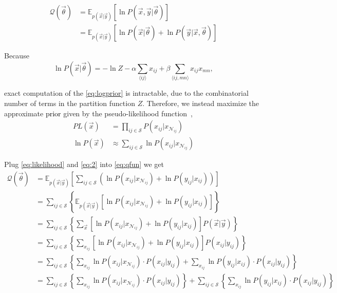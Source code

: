\documentclass[12pt]{article}
\begin{document}
\begin{align}
  \mathcal{Q}(\vec \theta) &= \mathbb{E}_{p(\vec x| \vec y)} [\ln P(\vec x, \vec y | \vec \theta)]\nonumber\\
  &= \mathbb{E}_{p(\vec x| \vec y)}[\ln P(\vec x| \vec \theta) + \ln P(\vec y | \vec x, \vec \theta) ] \label{eq:qfun}
\end{align}

Because 
\begin{equation}\ln P(\vec x | \vec \theta) = -\ln Z - \alpha \sum_{\langle ij \rangle} x_{ij} + \beta \sum_{\langle ij, mn \rangle} x_{ij}x_{mn}, \label{eq:logprior}
\end{equation}

exact  computation of the \eqref{eq:logprior} is intractable, due to
the combinatorial number of terms in the partition function $Z$. Therefore, we
instead maximize the approximate \textcolor{black}{prior} given by the pseudo-likelihood
function~\cite{li_markov_2009,besag_spatial_1974},
\begin{align}
  PL(\vec x) &= \prod_{ij \in \mathcal{S}}^{}P (x_{ij}|x_{\mathcal{N}_{ij}})\\
  \ln P(\vec x) &\approx \sum_{ij \in \mathcal{S}}^{} \ln P(x_{ij} | x_{\mathcal{N}_{ij}})\label{eq:2} 
\end{align}

Plug \eqref{eq:likelihood} and \eqref{eq:2} into \eqref{eq:qfun} we get
\begin{align}
  \mathcal{Q} (\vec \theta) &= \mathbb{E}_{p(\vec x| \vec y)} \left [ \sum_{ij\in \mathcal{S}} \left(\ln P(x_{ij} | x_{\mathcal{N}_{ij}}) + \ln P(y_{ij} | x_{ij})\right)\right] \nonumber \\
  &= \sum_{ij\in \mathcal{S}} \left \{ \mathbb{E}_{p(\vec x| \vec y)} \left [\ln P(x_{ij} | x_{\mathcal{N}_{ij}}) + \ln P(y_{ij} | x_{ij})\right] \right\}\nonumber \\
  &= \sum_{ij\in \mathcal{S}} \left \{ \sum_{\vec x} \left [\ln P(x_{ij} | x_{\mathcal{N}_{ij}}) + \ln P(y_{ij} | x_{ij})\right] P(\vec x | \vec y)\right\}\nonumber \\
  &= \sum_{ij\in \mathcal{S}} \left \{ \sum_{x_{ij}} \left [\ln P(x_{ij} | x_{\mathcal{N}_{ij}}) + \ln P(y_{ij} | x_{ij})\right] P(x_{ij} | y_{ij}) \right\}\nonumber \\
  &= \sum_{ij\in \mathcal{S}} \left \{ \sum_{x_{ij}} \ln P(x_{ij} | x_{\mathcal{N}_{ij}}) \cdot P(x_{ij} | y_{ij}) + \sum_{x_{ij}} \ln P(y_{ij} | x_{ij}) \cdot  P(x_{ij} | y_{ij}) \right\}\nonumber \\
  &= \sum_{ij\in \mathcal{S}} \left \{ \sum_{x_{ij}} \ln P(x_{ij} | x_{\mathcal{N}_{ij}}) \cdot P(x_{ij} | y_{ij}) \right \} + \sum_{ij\in \mathcal{S}} \left \{ \sum_{x_{ij}} \ln P(y_{ij} | x_{ij}) \cdot  P(x_{ij} | y_{ij}) \right\} \label{eq:qfun2}
\end{align}
\end{document}

